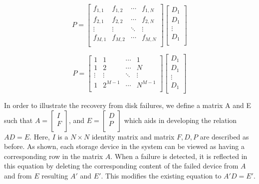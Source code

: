 \begin{equation}
\label{eq:parity1}
P= \left[
\begin{matrix}
f_{1,1}      & f_{1,2}      & \cdots & f_{1,N}      \\
f_{2,1}      & f_{2,2}      & \cdots & f_{2,N}      \\
\vdots & \vdots & \ddots & \vdots \\
f_{M,1}      & f_{M,2}      & \cdots & f_{M,N}      \\
\end{matrix}
\right]
\left[
\begin{matrix}

D_{1} \\
D_{1} \\
\vdots \\
D_{1} \\
\end{matrix}
\right]
\end{equation}

\begin{equation}
\label{eq:parity2}
P= \left[
\begin{matrix}
1      & 1      & \cdots & 1      \\
1      & 2      & \cdots & N      \\
\vdots & \vdots & \ddots & \vdots \\
1      & 2^{M-1}      & \cdots & N^{M-1}      \\
\end{matrix}
\right]
\left[
\begin{matrix}

D_{1} \\
D_{1} \\
\vdots \\
D_{1} \\
\end{matrix}
\right]
\end{equation}

 In order to illustrate the recovery from disk failures, we define a matrix A and E such that $A = \left[\begin{matrix}I \\F \\\end{matrix}\right]$, and $E= \left[\begin{matrix}D \\P \\\end{matrix}\right]$ which aids in developing the relation $AD = E$.
Here, $I$ is a $N \times N$ identity matrix and matrix $F, D, P$ are described as before. 
As shown, each storage device in the system can be viewed as having a corresponding row in the matrix $A$.
When a failure is detected, it is reflected in this equation by deleting the corresponding content of the failed device from $A$ and from $E$ resulting $A'$ and $E'$.
This modifies the existing equation to $A'D = E'$.

